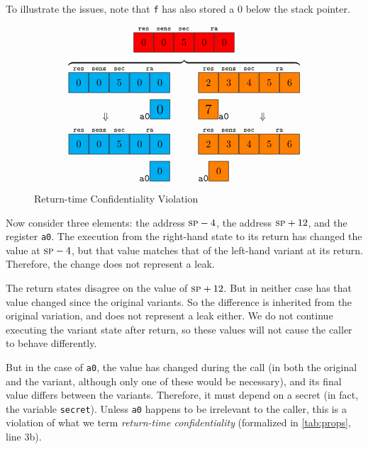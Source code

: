 \documentclass[10pt,conference]{ieeetran}%
\theoremstyle{definition}
\begin{document}
To illustrate the issues, note that {\tt f} has also stored a 0 below the stack pointer.
%
\begin{figure}
    \centering
    \[
    \stackrel{\texttt{res}}{\figfourbox[0]}
    \stackrel{\texttt{sens}}{\figfourbox[0]}
    \stackrel{\texttt{sec}}{\figfourbox[5]}
    \stackrel{\texttt{ra}}{\figfourbox[0]\figfourbox[0]}\]
    \[\overbrace{
    \stackrel{\texttt{res}}{\leftbox[0]}
    \stackrel{\texttt{sens}}{\leftbox[0]}
    \stackrel{\texttt{sec}}{\leftbox[5]}
    \stackrel{\texttt{ra}}{\leftbox[0]\leftbox[0]}
    \hspace{1cm}
    \stackrel{\texttt{res}}{\rightbox[2]}
    \stackrel{\texttt{sens}}{\rightbox[3]}
    \stackrel{\texttt{sec}}{\rightbox[4]}
    \stackrel{\texttt{ra}}{\rightbox[5]\rightbox[6]}}
    \]
    \[\large\Downarrow \hspace{1cm} \mathtt{a0} \leftbox[0] \hspace{1cm}
    \rightbox[7] \mathtt{a0} \hspace{1cm} \large\Downarrow\]
    \[
    \stackrel{\texttt{res}}{\leftbox[0]}
    \stackrel{\texttt{sens}}{\leftbox[0]}
    \stackrel{\texttt{sec}}{\leftbox[5]}
    \stackrel{\texttt{ra}}{\leftbox[0]\leftbox[0]}
    \hspace{1cm}
    \stackrel{\texttt{res}}{\rightbox[2]}
    \stackrel{\texttt{sens}}{\rightbox[3]}
    \stackrel{\texttt{sec}}{\rightbox[4]}
    \stackrel{\texttt{ra}}{\rightbox[5]\rightbox[6]}
    \]
    \[\mathtt{a0} \leftbox[0] \hspace{1cm}
    \mathtt{a0} \rightbox[0]\]
  \caption{Return-time Confidentiality Violation}
  \label{fig:variant3}
\end{figure}
%
Now consider three elements: the address \(\textsc{sp} - 4\), the address \(\textsc{sp} + 12\),
and the register {\tt a0}. The execution from the right-hand state to its return
has changed the value at \(\textsc{sp} - 4\), but that value matches that of the
left-hand variant at its return. Therefore, the change does not represent a leak.

The return states disagree on the value of \(\textsc{sp} + 12\). But in neither
case has that value changed since the original variants. So the difference is inherited from
the original variation, and does not represent a leak either. We do not continue executing the
variant state after return, so these values will not cause the caller to behave differently.

But in the case of {\tt a0}, the value has changed during the call (in both the original
and the variant, although only one of these would be necessary), and its final value
differs between the variants.
Therefore, it must depend on a secret (in fact, the variable {\tt secret}).
Unless {\tt a0} happens to be irrelevant to the caller, this is a violation of what
we term {\it return-time confidentiality} (formalized in \cref{tab:props}, line 3b).
\end{document}
